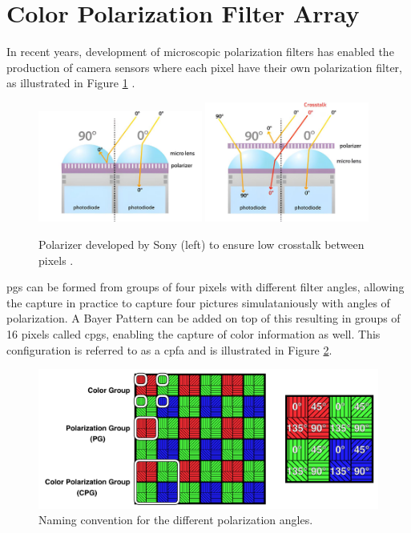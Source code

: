 \section{Color Polarization Filter Array}
In recent years, development of microscopic polarization filters has enabled the production of camera sensors where each pixel have their own polarization filter, as illustrated in Figure \ref{fig:camera_crosstalk} \cite{lucidvisionlabsLUCIDGoingPolarizedWhitePaper2018}.
\begin{figure}[H]
    \centering
    \includegraphics[width=0.48\textwidth]{figures/crosstalk_off_upscaled.jpg}
    \includegraphics[width=0.48\textwidth]{figures/crosstalk_upscaled.jpg}
    \caption{Polarizer developed by Sony (left) to ensure low crosstalk between pixels \cite{lucidvisionlabsPolarizationExplainedSony2018}.}
    \label{fig:camera_crosstalk}
\end{figure}
\glspl{pg} can be formed from groups of four pixels with different filter angles, allowing the capture in practice to capture four pictures simulataniously with angles of polarization.
A Bayer Pattern can be added on top of this resulting in groups of 16 pixels called \glspl{cpg}, enabling the capture of color information as well.
This configuration is referred to as a \gls{cpfa} and is illustrated in Figure \ref{fig:polarization_naming}.

\begin{figure}[H]
    \centering
    \includegraphics[width=\textwidth]{figures/polarized_image/naming.pdf}
    \caption{Naming convention for the different polarization angles.}
    \label{fig:polarization_naming}
\end{figure}

